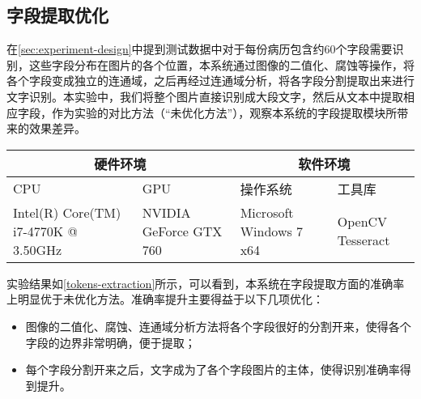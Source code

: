 \subsection{字段提取优化}
在\autoref{sec:experiment-design}中提到测试数据中对于每份病历包含约60个字段需要识别，这些字段分布在图片的各个位置，本系统通过图像的二值化、腐蚀等操作，将各个字段变成独立的连通域，之后再经过连通域分析，将各字段分割提取出来进行文字识别。本实验中，我们将整个图片直接识别成大段文字，然后从文本中提取相应字段，作为实验的对比方法（“未优化方法”），观察本系统的字段提取模块所带来的效果差异。
\begin{table}[!htbp]
	\label{tokens-extraction}
	\centering
	\vspace{10pt}
  \renewcommand\arraystretch{1.5}  %
	\begin{tabular}{p{3cm}|p{3cm}|p{3cm}|p{3cm}}
    \hline
    \multicolumn{2}{c|}{硬件环境} & \multicolumn{2}{c}{软件环境} \\
		\hline
    CPU&GPU&操作系统&工具库 \\
		\hline
    Intel(R) Core(TM)  i7-4770K @ 3.50GHz & NVIDIA GeForce  GTX 760 & Microsoft  Windows 7 x64 & OpenCV  Tesseract \\
    \hline
	\end{tabular}
\end{table}

实验结果如\autoref{tokens-extraction}所示，可以看到，本系统在字段提取方面的准确率上明显优于未优化方法。准确率提升主要得益于以下几项优化：
\begin{itemize}
  \item 图像的二值化、腐蚀、连通域分析方法将各个字段很好的分割开来，使得各个字段的边界非常明确，便于提取；
  \item 每个字段分割开来之后，文字成为了各个字段图片的主体，使得识别准确率得到提升。
\end{itemize}

